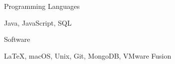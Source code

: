 \begin{cventries}
  \cventry
    {Programming Languages}
    {}
    { }
    { }
    {
      \begin{cvitems}
        \item {Java, JavaScript, SQL}
      \end{cvitems}
    }
  \cventry
    {Software}
    { }
    { }
    { }
    {
      \begin{cvitems}
        \item {LaTeX, macOS, Unix, Git, MongoDB, VMware Fusion}
      \end{cvitems}
    }
\end{cventries}
